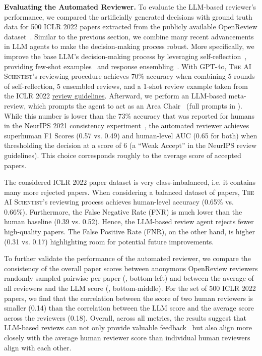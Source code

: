 \documentclass[11pt, a4paper]{include/gdm_format}
\newcommand{\ouralgo}{\textsc{The AI Scientist}\xspace}
\begin{document}
\textbf{Evaluating the Automated Reviewer.}
To evaluate the LLM-based reviewer's performance, we compared the artificially generated decisions with ground truth data for 500 ICLR 2022 papers extracted from the publicly available OpenReview dataset~\citep{iclr2022_github}.
Similar to the previous section, we combine many recent advancements in LLM agents to make the decision-making process robust.
More specifically, we improve the base LLM's decision-making process by leveraging self-reflection~\citep{shinn2024reflexion}, providing few-shot examples~\citep{wei2022chain} and response ensembling~\citep{wang2022self}.
With GPT-4o, \ouralgo's reviewing procedure achieves 70\% accuracy when combining 5 rounds of self-reflection, 5 ensembled reviews, and a 1-shot review example taken from the ICLR 2022 \href{https://iclr.cc/Conferences/2022/ReviewerGuide}{review guidelines}. Afterward, we perform an LLM-based meta-review, which prompts the agent to act as an Area Chair~\citep{wang2022self} (full prompts in ).
While this number is lower than the 73\% accuracy that was reported for humans in the NeurIPS 2021 consistency experiment~\citep{beygelzimer2021neurips}, the automated reviewer achieves superhuman F1 Scores (0.57 vs. 0.49) and human-level AUC (0.65 for both) when thresholding the decision at a score of 6 (a ``Weak Accept'' in the NeurIPS review guidelines). This choice corresponds roughly to the average score of accepted papers.

The considered ICLR 2022 paper dataset is very class-imbalanced, i.e. it contains many more rejected papers. When considering a balanced dataset of papers, \ouralgo's reviewing process achieves human-level accuracy (0.65\% vs. 0.66\%). Furthermore, the False Negative Rate (FNR) is much lower than the human baseline (0.39 vs. 0.52).
Hence, the LLM-based review agent rejects fewer high-quality papers.
The False Positive Rate (FNR), on the other hand, is higher (0.31 vs. 0.17) highlighting room for potential future improvements.

To further validate the performance of the automated reviewer, we compare the consistency of the overall paper scores between anonymous OpenReview reviewers randomly sampled pairwise per paper (, bottom-left) and between the average of all reviewers and the LLM score (, bottom-middle).
For the set of 500 ICLR 2022 papers, we find that the correlation between the score of two human reviewers is smaller (0.14) than the correlation between the LLM score and the average score across the reviewers (0.18).
Overall, across all metrics, the results suggest that LLM-based reviews can not only provide valuable feedback~\citep{darcy2024margmultiagentreviewgeneration} but also align more closely with the average human reviewer score than individual human reviewers align with each other.
\end{document}
